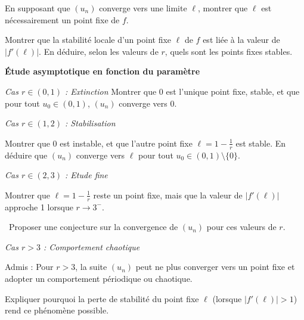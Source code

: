 \documentclass[10pt,a4paper]{article}
\begin{document}
\q %
En supposant que \( (u_n) \) converge vers une limite \( \ell \), montrer que \( \ell \) est nécessairement un point fixe de \( f \).

\q %
Montrer que la stabilité locale d'un point fixe \( \ell \) de \( f \) est liée à la valeur de \( |f'(\ell)| \). En déduire, selon les valeurs de \( r \), quels sont les points fixes stables.

\vspace{0.5cm}
\textbf{Étude asymptotique en fonction du paramètre}

\textit{Cas \( r \in (0,1) \) : Extinction}
\q Montrer que \( 0 \) est l'unique point fixe, stable, et que pour tout \( u_0 \in (0,1) \), \(
(u_n) \) converge vers \( 0 \).

\textit{Cas \( r \in (1,2) \) : Stabilisation}

\q Montrer que \( 0 \) est instable, et que l'autre point fixe \( \ell = 1 - \frac{1}{r} \) est
stable. En déduire que \( (u_n) \) converge vers \( \ell \) pour tout \( u_0 \in (0,1) \setminus
\{0\} \).

\textit{Cas \( r \in (2,3) \) : Etude fine}

\q Montrer que \( \ell = 1 - \frac{1}{r} \) reste un point fixe, mais que la valeur de \( |f'(\ell)|
\) approche 1 lorsque \( r \to 3^- \).

\ Proposer une conjecture sur la convergence de \( (u_n) \) pour ces valeurs de \( r \).

\textit{Cas \( r > 3 \) : Comportement chaotique}

Admis : Pour \( r > 3 \), la suite \( (u_n) \) peut ne plus converger vers un point fixe et adopter
un comportement périodique ou chaotique.

\q Expliquer pourquoi la perte de stabilité du point fixe \( \ell \) (lorsque \( |f'(\ell)| > 1 \))
rend ce phénomène possible.
\end{document}
